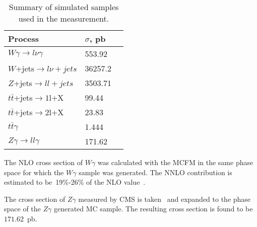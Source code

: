 \begin{table}[h]
  \small
  \begin{center}
    \caption{Summary of simulated samples used in the measurement.}
    \begin{tabular}{|l|l|l|}
      \hline
      Process                              & $\sigma$, pb         \\ \hline
      $W\gamma \rightarrow l\nu\gamma$     & 553.92     \\ \hline         %
      $W$+jets$ \rightarrow l\nu + jets$   & 36257.2   \\  \hline %
      $Z$+jets$ \rightarrow ll + jets$     & 3503.71         \\ \hline
      $t\bar{t}$+jets$\rightarrow 1$l+X    & 99.44    \\ \hline %
      $t\bar{t}$+jets$\rightarrow 2$l+X    & 23.83         \\ \hline
      $t\bar{t}\gamma$                     & 1.444          \\ \hline
      $Z\gamma \rightarrow ll\gamma$       & 171.62           \\ \hline
    \end{tabular}
    \label{tab:mc_bkg_samples}
  \end{center}
\end{table} 

The NLO cross section of $W\gamma$ was calculated with the MCFM in the same phase space for which the $W\gamma$ sample was generated. The NNLO contribution is estimated to be~19\%-26\% of the NLO value~\cite{ref_theory_NNLO}.

The cross section of $Z\gamma$ measured by CMS is taken~\cite{ref_Zg8TeV} and expanded to the phase space of the $Z\gamma$ generated MC sample. The resulting cross section is found to be~$171.62$~pb.
